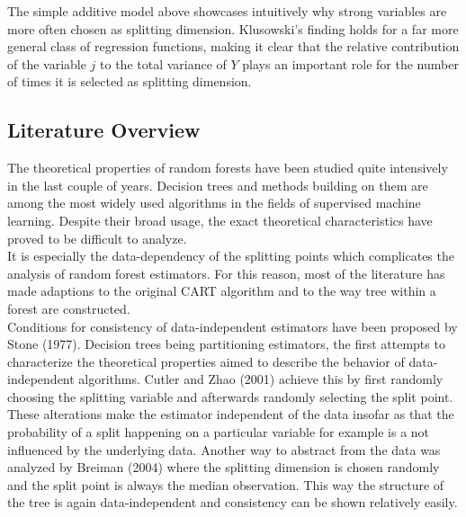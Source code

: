 {The simple additive model above showcases intuitively why strong variables are more often chosen as splitting dimension.
Klusowski's finding holds for a far more general class of regression functions, making it clear that the relative contribution of the variable $j$ to the total variance of $Y$ plays an important role for the number of times it is selected as splitting dimension.



\subsection{Literature Overview}

The theoretical properties of random forests have been studied quite intensively in the last couple of years. Decision trees and methods building on them are among the most widely used algorithms in the fields of supervised machine learning. Despite their broad usage, the exact theoretical characteristics have proved to be difficult to analyze. \\
It is especially the data-dependency of the splitting points which complicates the analysis of random forest estimators. For this reason, most of the literature has made adaptions to the original CART algorithm and to the way tree within a forest are constructed. \\
Conditions for consistency of data-independent estimators have been proposed by Stone (1977). Decision trees being partitioning estimators, the first attempts to characterize the theoretical properties aimed to describe the behavior of data-independent algorithms. Cutler and Zhao (2001) achieve this by first randomly choosing the splitting variable and afterwards randomly selecting the split point. These alterations make the estimator independent of the data insofar as that the probability of a split happening on a particular variable for example is a not influenced by the underlying data. Another way to abstract from the data was analyzed by Breiman (2004) where the splitting dimension is chosen randomly and the split point is always the median observation. This way the structure of the tree is again data-independent and consistency can be shown relatively easily. \\
}
